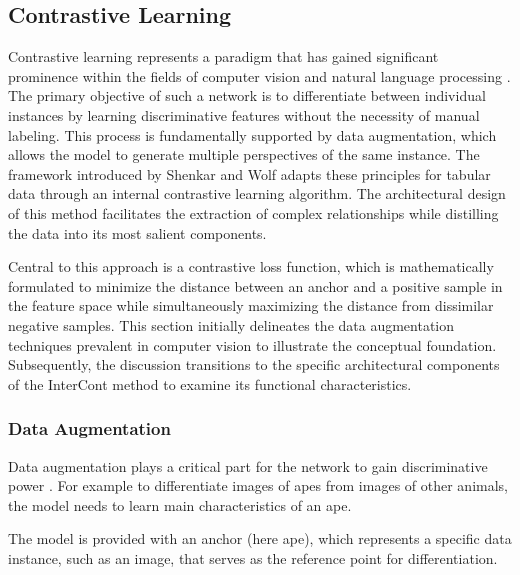 \subsection{Contrastive Learning}\label{sec:contrastive_learning}

Contrastive learning represents a paradigm that has gained significant prominence within the fields of computer vision and natural language processing \citep{hu2024comprehensive}. 
The primary objective of such a network is to differentiate between individual instances by learning discriminative features without the necessity of manual labeling. 
This process is fundamentally supported by data augmentation, which allows the model to generate multiple perspectives of the same instance. 
The framework introduced by Shenkar and Wolf adapts these principles for tabular data through an internal contrastive learning algorithm. 
The architectural design of this method facilitates the extraction of complex relationships while distilling the data into its most salient components. 


Central to this approach is a contrastive loss function, which is mathematically formulated to minimize the distance between an anchor and a positive sample in the feature space while simultaneously maximizing the distance from dissimilar negative samples. 
This section initially delineates the data augmentation techniques prevalent in computer vision to illustrate the conceptual foundation. 
Subsequently, the discussion transitions to the specific architectural components of the InterCont method to examine its functional characteristics. 



\subsubsection*{Data Augmentation} 
Data augmentation plays a critical part for the network to gain discriminative power \citep[Chapter 3.1]{hu2024comprehensive}.
For example to differentiate images of apes from images of other animals, the model needs to learn main characteristics of an ape.


The model is provided with an anchor (here ape), which represents a specific data instance, such as an image, that serves as the reference point for differentiation. 

